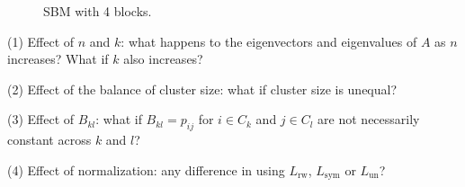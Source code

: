 \documentclass[english]{article}
\begin{document}
\begin{enumerate}
\begin{figure}[h]
\caption{
SBM with 4 blocks.
}
\label{fig:1}
\end{figure}


(1)
Effect of $n$ and $k$: what happens to the eigenvectors and eigenvalues of $A$ as $n$ increases? What if $k$ also increases? 

(2)
Effect of the balance of cluster size: what if cluster size is unequal?

(3) 
Effect of $B_{kl}$: what if $B_{kl} = p_{ij}$ for $i\in C_k$ and $j\in C_l$ are not necessarily constant across $k$ and $l$?

(4)
Effect of normalization: any difference in using $L_{\text{rw}}$, $L_{\text{sym}}$ or $L_{\text{un}}$? 



\end{enumerate}
\end{document}
